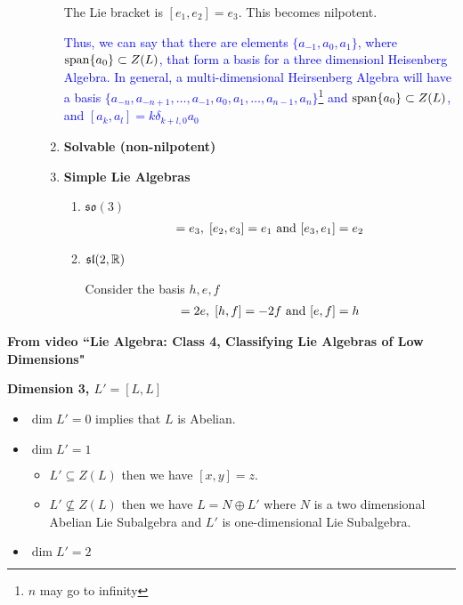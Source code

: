 \documentclass[12pt,a4paper]{report}
\newcommand{\BLUE}[1]{\textcolor{blue}{#1}}
\begin{document}
\begin{description}
\begin{enumerate}
		The Lie bracket is $[e_1, e_2] = e_3$.  This becomes nilpotent.
		
		\BLUE{Thus, we can say that there are elements $\{a_{-1}, a_0, a_1\}$, where $\operatorname{span}\{a_0\} \subset Z(L)$, that form a basis for a three dimensionl Heisenberg Algebra.  In general, a multi-dimensional Heirsenberg Algebra will have a basis $\{a_{-n},a_{-n+1}, \dots, a_{-1},a_0, a_1, \dots, a_{n-1}, a_n\}$\footnote{$n$ may go to infinity} and $\operatorname{span}\{a_0\} \subset Z(L)$, and $[a_k, a_l] = k\delta_{k+l,0}a_0$
		}
		
		\item \textbf{Solvable (non-nilpotent)}	
	
	
		\item \textbf{Simple Lie Algebras}
		
		\begin{enumerate}
			\item $\mathfrak{so}(3)$
				\begin{align*}
					[e_1, e_2] = e_3, \; [e_2, e_3] = e_1 \AND [e_3, e_1]=e_2
				\end{align*}
			\item $\mathfrak{sl}(2, \mathbb{R})$
			
			Consider the basis $h, e, f$
			\begin{align*}
				[h,e] = 2e,\;[h,f]=-2f \AND [e,f]=h
			\end{align*}
		\end{enumerate}
		
		
	\end{enumerate}
\end{description}

\HLINE
\textbf{From video ``Lie Algebra: Class 4, Classifying Lie Algebras of Low Dimensions"}

\textbf{Dimension 3, $L'=[L,L]$}

\begin{itemize}
	\item $\dim L' = 0$ implies that $L$ is Abelian.
	\item $\dim L' = 1$
	\begin{itemize}
		\item $L' \subseteq Z(L)$ then we have $[x,y]=z$.
		\item $L' \not \subseteq Z(L)$ then we have $L = N\oplus L'$ where $N$ is a two dimensional Abelian Lie Subalgebra and $L'$ is one-dimensional Lie Subalgebra.
	\end{itemize}
	
	\item $\dim L' = 2$
\end{itemize}
\end{document}
